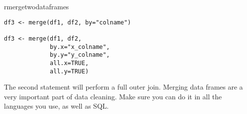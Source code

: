 \begin{subanswer}{rmergetwodataframes}
\begin{verbatim}
df3 <- merge(df1, df2, by="colname")

df3 <- merge(df1, df2,
             by.x="x_colname",
             by.y="y_colname",
             all.x=TRUE,
             all.y=TRUE)
\end{verbatim}
The second statement will perform a full outer join.
Merging data frames are a very important part of data cleaning.
Make sure you can do it in all the languages you use, as well as SQL.
\end{subanswer}
